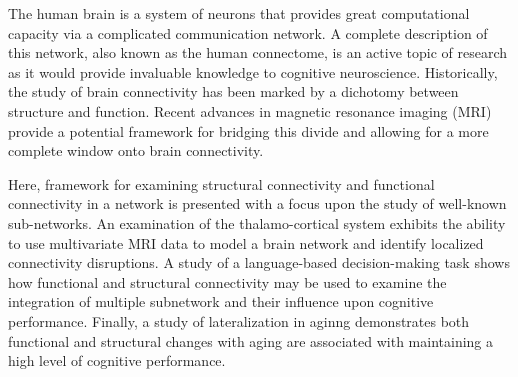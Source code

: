 The human brain is a system of neurons that provides great computational capacity via a complicated communication network. A complete description of this network, also known as the human connectome, is an active topic of research as it would provide invaluable knowledge to cognitive neuroscience. Historically, the study of brain connectivity has been marked by a dichotomy between structure and function. Recent advances in magnetic resonance imaging (MRI) provide a potential framework for bridging this divide and allowing for a more complete window onto brain connectivity. 

Here, framework for examining structural connectivity and functional connectivity in a network is presented with a focus upon the study of well-known sub-networks. An examination of the thalamo-cortical system exhibits the ability to use multivariate MRI data to model a brain network and identify localized connectivity disruptions. A study of a language-based decision-making task shows how functional and structural connectivity may be used to examine the integration of multiple subnetwork and their influence upon cognitive performance. Finally, a study of lateralization in aginng demonstrates both functional and structural changes with aging are associated with maintaining a high level of cognitive performance.
